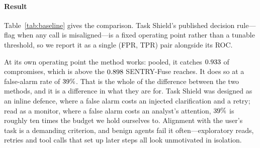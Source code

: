 \documentclass[preprint,12pt,authoryear]{elsarticle}
\theoremstyle{definition}
\begin{document}
\paragraph{Result} Table~\ref{tab:baseline} gives the comparison. Task Shield's
published decision rule---flag when any call is misaligned---is a fixed operating
point rather than a tunable threshold, so we report it as a single (FPR, TPR) pair
alongside its ROC.

At its own operating point the method works: pooled, it catches $0.933$ of
compromises, which is above the $0.898$ SENTRY-Fuse reaches. It does so at a
false-alarm rate of $39\%$. That is the whole of the difference
between the two methods, and it is a difference in what they are for. Task Shield
was designed as an inline defence, where a false alarm costs an injected
clarification and a retry; read as a monitor, where a false alarm costs an analyst's
attention, $39\%$ is roughly ten times the budget we hold ourselves
to. Alignment with the user's task is a demanding criterion, and benign agents fail
it often---exploratory reads, retries and tool calls that set up later steps all
look unmotivated in isolation.
\end{document}
